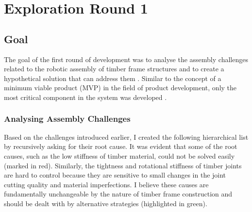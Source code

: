\chapter{Exploration Round 1}
\label{chapter:exploration_round_1}

\section{Goal}
\label{section:exploration_1_goal}

The goal of the first round of development was to analyse the assembly challenges related to the robotic assembly of timber frame structures and to create a hypothetical solution that can address them . Similar to the concept of a minimum viable product (MVP) in the field of product development, only the most critical component in the system was developed .
\subsection{Analysing Assembly Challenges}
\label{subsection:exploration_1_analysing_assembly_challenges}

Based on the challenges introduced earlier, I created the following hierarchical list by recursively asking for their root cause. It was evident that some of the root causes, such as the low stiffness of timber material, could not be solved easily (marked in red). Similarly, the tightness and rotational stiffness of timber joints are hard to control because they are sensitive to small changes in the joint cutting quality and material imperfections. I believe these causes are fundamentally unchangeable by the nature of timber frame construction and should be dealt with by alternative strategies (highlighted in green). 

